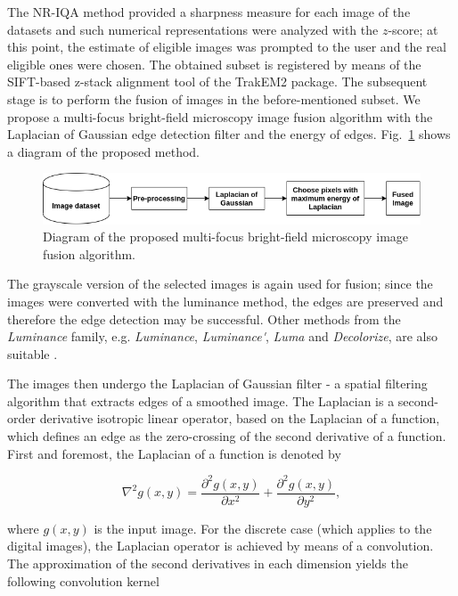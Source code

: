 The NR-IQA method provided a sharpness measure for each image of the datasets and such numerical representations were analyzed with the $z$-score; at this point, the estimate of eligible images was prompted to the user and the real eligible ones were chosen. The obtained subset is registered by means of the SIFT-based z-stack alignment tool of the TrakEM2 package. The subsequent stage is to perform the fusion of images in the before-mentioned subset. We propose a multi-focus bright-field microscopy image fusion algorithm with the Laplacian of Gaussian edge detection filter and the energy of edges. Fig.~\ref{fig:fusion_pipeline} shows a diagram of the proposed method.

\begin{figure}[ht]
    \centering
    \caption{Diagram of the proposed multi-focus bright-field microscopy image fusion algorithm.}
    \label{fig:fusion_pipeline}
    \includegraphics[scale=0.65]{images/fusion_pipeline.png}
    \centering
    \fautor
\end{figure}

The grayscale version of the selected images is again used for fusion; since the images were converted with the luminance method, the edges are preserved and therefore the edge detection may be successful. Other methods from the \emph{Luminance} family, e.g. \emph{Luminance}, \emph{Luminance\'}, \emph{Luma} and \emph{Decolorize}, are also suitable \cite{kanan2012color}.

The images then undergo the Laplacian of Gaussian filter - a spatial filtering algorithm that extracts edges of a smoothed image. The Laplacian is a second-order derivative isotropic linear operator, based on the Laplacian of a function, which defines an edge as the zero-crossing of the second derivative of a function. First and foremost, the Laplacian of a function is denoted by

\begin{equation}
\label{eqn:laplacian_of_function}
\nabla^{2}g(x,y) = \frac{\partial^{2} g(x,y)}{\partial x^{2}}
                    +
                  \frac{\partial^{2} g(x,y)}{\partial y^{2}},
\end{equation}

\noindent where $g(x,y)$ is the input image. For the discrete case (which applies to the digital images), the Laplacian operator is achieved by means of a convolution. The approximation of the second derivatives in each dimension yields the following convolution kernel

